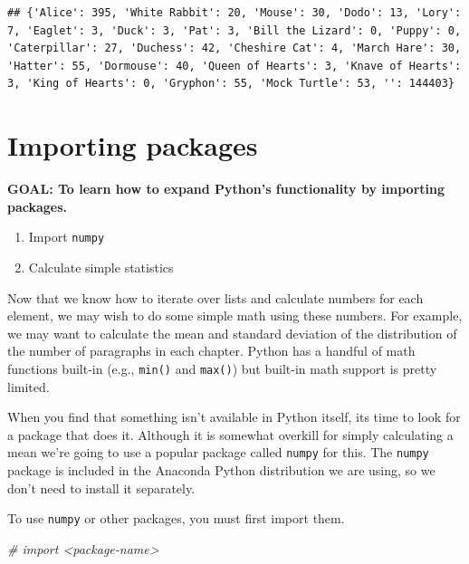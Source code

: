 \documentclass[
]{book}
\newenvironment{Shaded}{\begin{snugshade}}{\end{snugshade}}
\newcommand{\CommentTok}[1]{\textcolor[rgb]{0.56,0.35,0.01}{\textit{#1}}}
\providecommand{\tightlist}{%
  \setlength{\itemsep}{0pt}\setlength{\parskip}{0pt}}
\begin{document}
\begin{alert}
\begin{verbatim}
## {'Alice': 395, 'White Rabbit': 20, 'Mouse': 30, 'Dodo': 13, 'Lory': 7, 'Eaglet': 3, 'Duck': 3, 'Pat': 3, 'Bill the Lizard': 0, 'Puppy': 0, 'Caterpillar': 27, 'Duchess': 42, 'Cheshire Cat': 4, 'March Hare': 30, 'Hatter': 55, 'Dormouse': 40, 'Queen of Hearts': 3, 'Knave of Hearts': 3, 'King of Hearts': 0, 'Gryphon': 55, 'Mock Turtle': 53, '': 144403}
\end{verbatim}

\end{alert}

\hypertarget{importing-packages}{%
\section{Importing packages}\label{importing-packages}}

\begin{alert}

\textbf{GOAL: To learn how to expand Python's functionality by importing packages.}

\begin{enumerate}
\def\labelenumi{\arabic{enumi}.}
\tightlist
\item
  Import \texttt{numpy}
\item
  Calculate simple statistics
\end{enumerate}

\end{alert}

Now that we know how to iterate over lists and calculate numbers for each element, we may wish to do some simple math using these numbers. For example, we may want to calculate the mean and standard deviation of the distribution of the number of paragraphs in each chapter. Python has a handful of math functions built-in (e.g., \texttt{min()} and \texttt{max()}) but built-in math support is pretty limited.

When you find that something isn't available in Python itself, its time to look for a package that does it. Although it is somewhat overkill for simply calculating a mean we're going to use a popular package called \texttt{numpy} for this. The \texttt{numpy} package is included in the Anaconda Python distribution we are using, so we don't need to install it separately.

To use \texttt{numpy} or other packages, you must first import them.

\begin{Shaded}
\begin{Highlighting}[]
\CommentTok{\# import \textless{}package{-}name\textgreater{}}
\end{Highlighting}
\end{Shaded}
\end{document}
